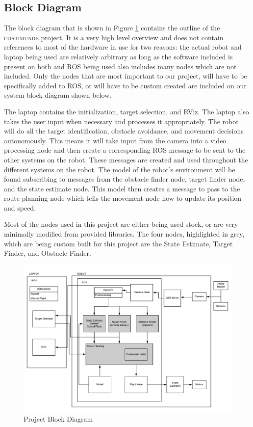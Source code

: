 \documentclass{article}
\begin{document}
	\subsection{Block Diagram}
	
	The block diagram that is shown in Figure \ref{fig:blockdiagram} contains the outline of the \textsc{coatimunde} project. It is a very high level overview and does not contain references to most of the hardware in use for two reasons: the actual robot and laptop being used are relatively arbitrary as long as the software included is present on both and ROS being used also includes many nodes which are not included. Only the nodes that are most important to our project, will have to be specifically added to ROS, or will have to be custom created are included on our system block diagram shown below.
	
	The laptop contains the initialization, target selection, and RViz. The laptop also takes the user input when necessary and processes it appropriately.  The robot will do all the target identification, obstacle avoidance, and movement decisions autonomously. This means it will take input from the camera into a video processing node and then create a corresponding ROS message to be sent to the other systems on the robot. These messages are created and used throughout the different systems on the robot. The model of the robot's environment will be found subscribing to messages from the obstacle finder node, target finder node, and the state estimate node. This model then creates a message to pass to the route planning node which tells the movement node how to update its position and speed. 
	
	Most of the nodes used in this project are either being used stock, or are very minimally modified from provided libraries. The four nodes, highlighted in grey, which are being custom built for this project are the State Estimate, Target Finder, and Obstacle Finder. 

	\begin{figure}[H]
		\centering
		\includegraphics[width=0.9\linewidth]{BlockDiagram}
		\caption{Project Block Diagram}
		\label{fig:blockdiagram}
	\end{figure}
\end{document}

